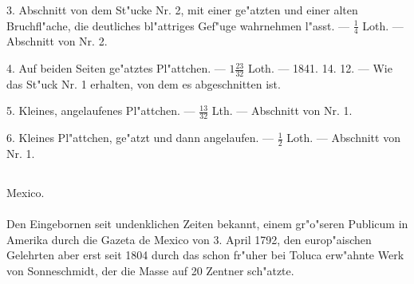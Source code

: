 \documentclass[a4paper, 11pt, oneside, polutonikogreek, german]{article}
\begin{document}
3. Abschnitt von dem St"ucke Nr. 2, mit einer ge"atzten und einer alten Bruchfl"ache, die deutliches bl"attriges Gef"uge wahrnehmen l"asst. --- $\mathfrak{\frac{1}{4}}$ Loth. --- Abschnitt von Nr. 2.

4. Auf beiden Seiten ge"atztes Pl"attchen. --- $\mathfrak{1\frac{23}{32}}$ Loth. --- 1841. 14. 12. --- Wie das St"uck Nr. 1 erhalten, von dem es abgeschnitten ist.

5. Kleines, angelaufenes Pl"attchen. --- $\mathfrak{\frac{13}{32}}$ Lth. --- Abschnitt von Nr. 1.

6. Kleines Pl"attchen, ge"atzt und dann angelaufen. --- $\mathfrak{\frac{1}{2}}$ Loth. --- Abschnitt von Nr. 1.
\subsection{}
\begin{center}

Mexico.
\end{center}
\paragraph{}
Den Eingebornen seit undenklichen Zeiten bekannt, einem gr"o"seren Publicum in Amerika durch die Gazeta de Mexico von 3. April 1792, den europ"aischen Gelehrten aber erst seit 1804 durch das schon fr"uher bei Toluca erw"ahnte Werk von Sonneschmidt, der die Masse auf 20 Zentner sch"atzte.

\setlength{\leftskip}{10mm}
\setlength{\parindent}{0pt}
\end{document}
